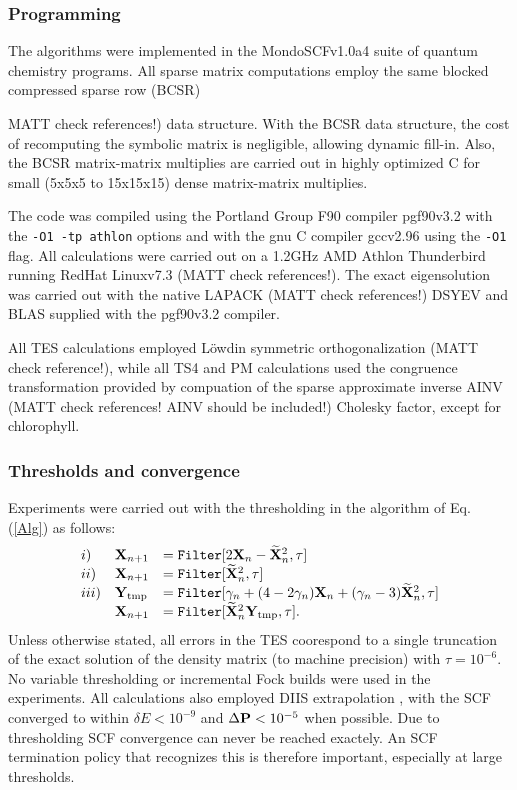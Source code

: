 \commentoutA{\documentclass[prb,aps,twocolumn,twocolumngrid,secnumarabic,superbib,hyperref]{revtex4}}
\begin{document}
\subsubsection{Programming}
The algorithms were implemented in the {\sc MondoSCF}v1.0a4 suite of 
quantum chemistry programs\cite{MondoSCF}.  
All sparse matrix computations employ the same blocked compressed sparse row 
(BCSR)\cite{Challacombe99,MChallacombe00} {MATT check references!) 
data structure.  With the BCSR data structure, the cost of recomputing the symbolic 
matrix is negligible, allowing dynamic fill-in.  Also, the BCSR matrix-matrix multiplies 
are carried out in highly optimized C for small 
(5x5x5 to 15x15x15) dense matrix-matrix multiplies. 

The code was compiled using the 
Portland Group F90 compiler {\sc pgf90}v3.2 \cite{pgf90} with the {\tt -O1 -tp athlon} 
options  and with the gnu C compiler {\sc gcc}v2.96 using the {\tt -O1} flag.  All 
calculations were carried out on a 1.2GHz AMD Athlon Thunderbird running RedHat 
{\sc Linux}v7.3\cite{RedHat73} (MATT check references!).  The exact eigensolution was carried out with the native
{\sc LAPACK} \cite{LAPACK}  (MATT check references!) {\sc DSYEV} and {\sc BLAS} supplied with the {\sc pgf90}v3.2 compiler.

All TES calculations employed L{\"o}wdin symmetric orthogonalization \cite{PLowdin50} (MATT check reference!), 
while all TS4 and PM calculations used the congruence transformation provided by
compuation of the sparse approximate inverse AINV \cite{AINV,MChallacombe02c} 
(MATT check references! AINV should be included!) Cholesky factor, except for chlorophyll.

\subsubsection{Thresholds and convergence}
Experiments were carried out with the thresholding in the algorithm of Eq. (\ref{Alg})
as follows:
\begin{equation} 
\begin{array}{lll}
i)    &{\bf X}_{n+1} &= {\tt Filter}[2{\bf X}_n - \widetilde{\bf X}^2_n,\tau] \\
ii)   &{\bf X}_{n+1} &= {\tt Filter}[\widetilde{\bf X}^2_n,\tau] \\
iii)  &{\bf Y}_{\rm tmp}     &= {\tt Filter}[\gamma_n + (4-2\gamma_n){\bf X}_n + (\gamma_n-3)\widetilde{\bf X}^2_n,\tau] \\
      &{\bf X}_{n+1} &= {\tt Filter}[\widetilde{\bf X}^2_n {\bf Y}_{\rm tmp},\tau].
\end{array}
\end{equation}
Unless otherwise stated, all errors in the TES coorespond to a single
truncation of the exact solution of the density matrix (to machine precision) with $\tau=10^{-6}$.
No variable thresholding or incremental Fock builds were used in the experiments. 
All calculations also employed DIIS extrapolation \cite{PPulay88}, with the SCF
converged to within $\delta E < 10^{-9}$ and $\Delta{\bf P} < 10^{-5}$ when possible.
Due to thresholding SCF convergence can never be reached exactely.
An SCF termination policy that recognizes this is therefore important,
especially at large thresholds. 

}
\end{document}
